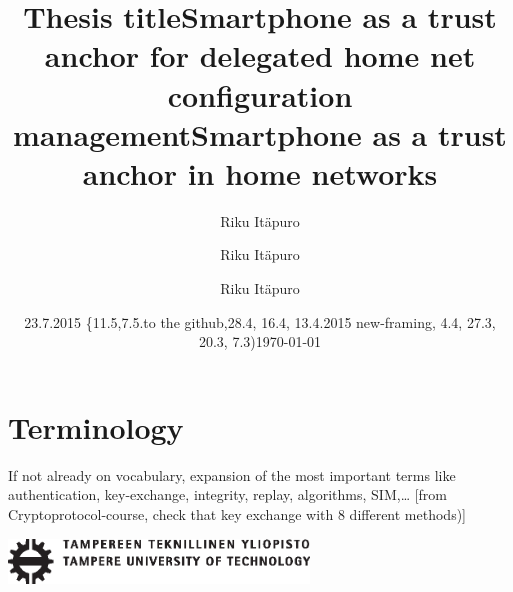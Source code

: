 \documentclass[12pt,a4paper,english]{tutthesis}
\author{Riku Itäpuro}
\title{Thesis title}      %
\author{Riku Itäpuro}
\title{Smartphone as a trust anchor for delegated home net configuration management}
\author{Riku Itäpuro}
\date{23.7.2015  \{11.5,7.5.to the github,28.4, 16.4, 13.4.2015 new-framing, 4.4, 27.3,  20.3, 7.3)}
\title{Smartphone as a trust anchor in home networks}
\begin{document}
\maketitle



\chapter*{Terminology}
\markboth{}{}                                %

If not already on vocabulary, expansion of the most important terms like
authentication, key-exchange, integrity, replay, algorithms, SIM,\ldots{}
[from Cryptoprotocol-course, check that key exchange with 8 different methods)]

\newpage             %

 \pagestyle{headings}
 \thispagestyle{empty}
\date\today
 \vspace*{-.5cm}\noindent
 \includegraphics[width=8cm]{tty_tut_logo}   %

\vspace{6.8cm}
\maketitle
\vspace{6.7cm} %
\end{document}
